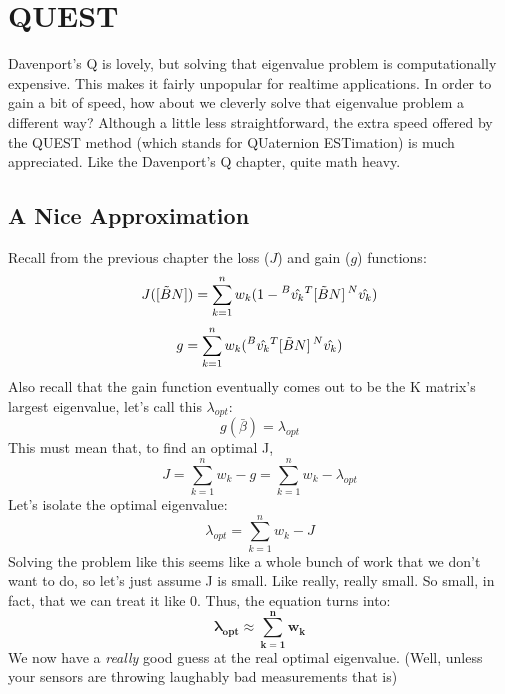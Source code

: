 \documentclass[a4paper,14pt]{extreport}
\newcommand{\vk}[1]{\prescript{#1}{}{\hat{v_k}}}
\begin{document}
\chapter{QUEST}
Davenport's Q is lovely, but solving that eigenvalue problem is computationally expensive. This makes it fairly unpopular for realtime applications. In order to gain a bit of speed, how about we cleverly solve that eigenvalue problem a different way? Although a little less straightforward, the extra speed offered by the QUEST method (which stands for QUaternion ESTimation) is much appreciated. Like the Davenport's Q chapter, quite math heavy.
\section{A Nice Approximation}
Recall from the previous chapter the loss ($J$) and gain ($g$) functions:
\[
J([\tilde{B}N]) = \sum^n_{k=1} w_k (1- \vk{B}^T[\tilde{B}N]\vk{N})
\]
\[
g = \sum^n_{k=1} w_k (\vk{B}^T[\tilde{B}N]\vk{N})
\]
Also recall that the gain function eventually comes out to be the K matrix's largest eigenvalue, let's call this $\lambda_{opt}$:
\[
g(\bar{\beta}) = \lambda_{opt}
\]
This must mean that, to find an optimal J,
\[
J = \sum^n_{k=1} w_k - g = \sum^n_{k=1} w_k - \lambda_{opt}
\]
Let's isolate the optimal eigenvalue:
\[
\lambda_{opt} = \sum^n_{k=1} w_k - J
\]
Solving the problem like this seems like a whole bunch of work that we don't want to do, so let's just assume J is small. Like really, really small. So small, in fact, that we can treat it like 0. Thus, the equation turns into:
\[
\mathbf{
\lambda_{opt} \approx \sum^n_{k=1} w_k
}\]
We now have a \emph{really} good guess at the real optimal eigenvalue. (Well, unless your sensors are throwing laughably bad measurements that is)
\end{document}
